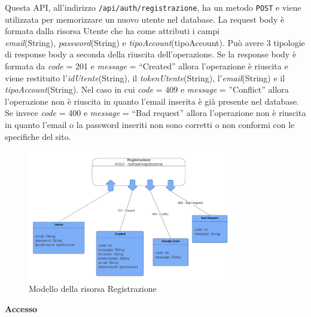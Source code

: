 \documentclass[a4paper,12pt]{article}
\begin{document}
Questa API, all’indirizzo \texttt{/api/auth/registrazione}, ha un metodo \texttt{POST} e viene utilizzata per memorizzare un nuovo utente nel database. \newline
La request body è formata dalla risorsa Utente che ha come attributi i campi \\ \textit{email}(String), \textit{password}(String) e \textit{tipoAccount}(tipoAccount). \newline
Può avere 3 tipologie di response body a seconda della riuscita dell’operazione. \newline
Se la response body è formata da \textit{code} = 201 e \textit{message} = “Created” allora l’operazione è riuscita e viene restituito l’\textit{idUtente}(String), il \textit{tokenUtente}(String), l’\textit{email}(String) e il \textit{tipoAccount}(String). \newline
Nel caso in cui \textit{code} = 409  e \textit{message} = ”Conflict” allora l’operazione non è riuscita in quanto l’email inserita è già presente nel database. \newline
Se invece \textit{code} = 400 e \textit{message} = “Bad request” allora l’operazione non è riuscita in quanto l’email o la password inseriti non sono corretti o non conformi con le specifiche del sito. 

\begin{figure}[htp]
    \centering
    \includegraphics[width=0.8\textwidth]{resource-models/registrazione.png}
    \caption{Modello della risorsa Registrazione}
\end{figure}

\textbf{Accesso}
\end{document}
